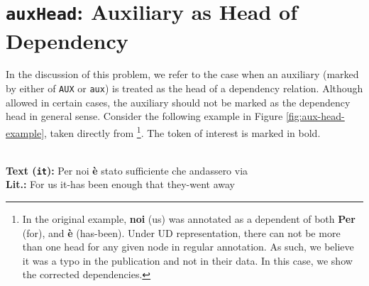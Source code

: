 \section{\texttt{auxHead}: Auxiliary as Head of Dependency}
\label{future:auxHead}

In the discussion of this problem, we refer to the case when an auxiliary (marked by either of \verb|AUX| or \verb|aux|) is treated as the head of a dependency relation. Although allowed in certain cases, the auxiliary should not be marked as the dependency head in general sense. Consider the following example in Figure \ref{fig:aux-head-example}, taken directly from \cite{alzetta2017dangerous}\footnote{In the original example, \textbf{noi} (us) was annotated as a dependent of both  \textbf{Per} (for), and \textbf{\`e} (has-been). Under UD representation, there can not be more than one head for any given node in regular annotation. As such, we believe it was a typo in the publication and not in their data. In this case, we show the corrected dependencies.}. The token of interest is marked in bold.

\begin{example}
\textbf{ }\\
\textbf{Text (\texttt{it}):} Per noi \textbf{\`e} stato sufficiente che andassero via\\
\textbf{Lit.:} For us it-has been enough that they-went away\\
\end{example}
    
